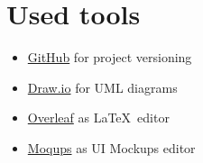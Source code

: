 \section{Used tools}
\begin{itemize}
    \item \href{https://github.com/}{GitHub} for project versioning
    \item \href{https://www.drawio.com/}{Draw.io} for UML diagrams
    \item \href{https://www.overleaf.com}{Overleaf} as \LaTeX\ editor
    \item \href{https://moqups.com/it/}{Moqups} as UI Mockups editor
\end{itemize}